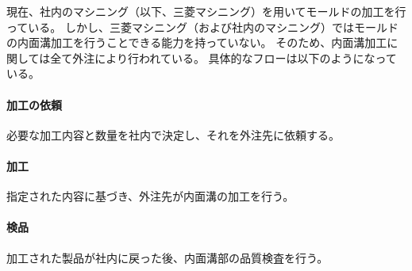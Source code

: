 







現在、社内のマシニング（以下、三菱マシニング）を用いてモールドの加工を行っている。
しかし、三菱マシニング（および社内のマシニング）ではモールドの内面溝加工を行うことできる能力を持っていない。
そのため、内面溝加工に関しては全て外注により行われている。
具体的なフローは以下のようになっている。

\paragraph*{加工の依頼}
必要な加工内容と数量を社内で決定し、それを外注先に依頼する。

\paragraph*{加工}
指定された内容に基づき、外注先が内面溝の加工を行う。

\paragraph*{検品}
加工された製品が社内に戻った後、内面溝部の品質検査を行う。



\modHeadsection{}





